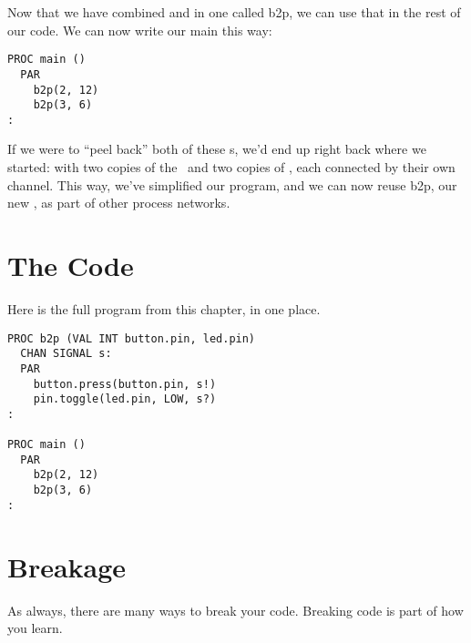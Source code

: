 Now that we have combined \bp and \tp in one \PROC called {\code b2p}, we can use that in the rest of our code. We can now write our {\code main} \PROC this way:

\vspace{3mm}
\begin{lstlisting}
PROC main ()
  PAR
    b2p(2, 12)
    b2p(3, 6)
:
\end{lstlisting}

If we were to ``peel back'' both of these {\PROCedure}s, we'd end up right back where we started: with two copies of the \bp ~\PROC and two copies of \tp, each connected by their own channel. This way, we've simplified our program, and we can now reuse {\code b2p}, our new \PROC, as part of other process networks.

\newpage

\section{The Code}

Here is the full program from this chapter, in one place.

\vspace{3mm}
\begin{lstlisting}
PROC b2p (VAL INT button.pin, led.pin)
  CHAN SIGNAL s:
  PAR
    button.press(button.pin, s!)
    pin.toggle(led.pin, LOW, s?)
:

PROC main ()
  PAR
    b2p(2, 12)
    b2p(3, 6)
:
\end{lstlisting}

\section{Breakage}
As always, there are many ways to break your code. Breaking code is part of how you learn.


